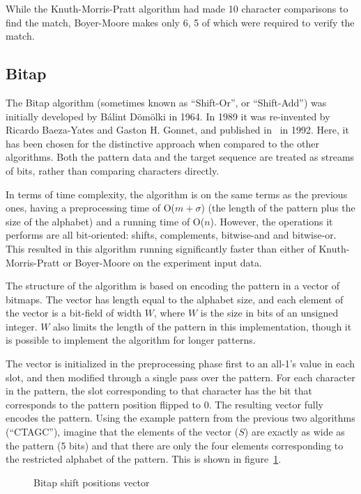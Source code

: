While the Knuth-Morris-Pratt algorithm had made 10 character comparisons to find the match, Boyer-Moore makes only 6, 5 of which were required to verify the match.

\subsection{Bitap}

The Bitap algorithm (sometimes known as ``Shift-Or'', or ``Shift-Add'') was initially developed by B\'{a}lint D\"{o}m\"{o}lki in 1964. In 1989 it was re-invented by Ricardo Baeza-Yates and Gaston H. Gonnet, and published in~\cite{baeza} in 1992. Here, it has been chosen for the distinctive approach when compared to the other algorithms. Both the pattern data and the target sequence are treated as streams of bits, rather than comparing characters directly.

In terms of time complexity, the algorithm is on the same terms as the previous ones, having a preprocessing time of O($m+\sigma$) (the length of the pattern plus the size of the alphabet) and a running time of O($n$). However, the operations it performs are all bit-oriented: shifts, complements, bitwise-and and bitwise-or. This resulted in this algorithm running significantly faster than either of Knuth-Morris-Pratt or Boyer-Moore on the experiment input data.

The structure of the algorithm is based on encoding the pattern in a vector of bitmaps. The vector has length equal to the alphabet size, and each element of the vector is a bit-field of width $W$, where $W$ is the size in bits of an unsigned integer. $W$ also limits the length of the pattern in this implementation, though it is possible to implement the algorithm for longer patterns.

The vector is initialized in the preprocessing phase first to an all-1's value in each slot, and then modified through a single pass over the pattern. For each character in the pattern, the slot corresponding to that character has the bit that corresponds to the pattern position flipped to 0. The resulting vector fully encodes the pattern. Using the example pattern from the previous two algorithms (``CTAGC''), imagine that the elements of the vector ($S$) are exactly as wide as the pattern (5 bits) and that there are only the four elements corresponding to the restricted alphabet of the pattern. This is shown in figure~\ref{fig:bitap_s_positions}.

\begin{figure}[ht]
\centering

\caption{Bitap shift positions vector}
\label{fig:bitap_s_positions}
\end{figure}

